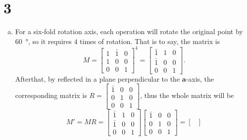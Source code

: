 \documentclass[openany]{homework}
\begin{document}
\section*{3}
\begin{enumerate}[a.]
    \item For a six-fold rotation axis, each operation will rotate the original point by \SI{60}{\degree}, so it requires $4$ times of rotation.
    That is to say, the matrix is 
    \begin{equation}
        M = \begin{bmatrix}
                        1 & \bar{1} & 0\\
                        1 & 0           & 0\\
                        0 & 0           & 1
                  \end{bmatrix}^4 =
                   \begin{bmatrix}
                      \bar{1} & 1 & 0\\
                      \bar{1} & 0 & 0\\
                      0 &           0 & 1
              \end{bmatrix}.
    \end{equation}
    Afterthat, by reflected in a plane perpendicular to the $\bm{a}$-axis, the corresponding matrix is 
    $R = \left[\begin{smallmatrix}
        \bar{1} & 0 & 0\\
        0           & 1 & 0\\
        0           & 0 & 1
    \end{smallmatrix}\right]$,
    thus the whole matrix will be 
    \begin{equation}
        M' = M R =\begin{bmatrix}
                             \bar{1} & 1 & 0\\
                             \bar{1} & 0 & 0\\
                             0 &           0 & 1
                        \end{bmatrix}
                        \begin{bmatrix}
                                \bar{1} & 0 & 0\\
                                0           & 1 & 0\\
                                0           & 0 & 1
                        \end{bmatrix} = 
                        \begin{bmatrix}

\end{bmatrix}
\end{equation}
\end{enumerate}
\end{document}
